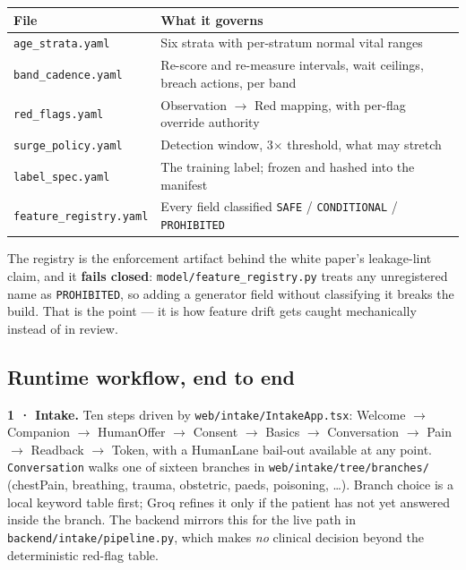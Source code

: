\documentclass[10pt,a4paper,twocolumn]{article}
\newcommand{\pth}[1]{\textcolor{SecPurple}{\texttt{#1}}}
\newcommand{\cm}[1]{\texttt{#1}}
\begin{document}
\begin{center}\footnotesize\sffamily
\begin{tabular}{@{}p{3.15cm}p{4.65cm}@{}}
\toprule
\rowcolor{AccPurple!10}
\textbf{File} & \textbf{What it governs}\\
\midrule
\cm{age\_strata.yaml} & Six strata with per-stratum normal vital ranges\\
\addlinespace[2pt]
\cm{band\_cadence.yaml} & Re-score and re-measure intervals, wait ceilings, breach actions, per band\\
\addlinespace[2pt]
\cm{red\_flags.yaml} & Observation $\rightarrow$ Red mapping, with per-flag override authority\\
\addlinespace[2pt]
\cm{surge\_policy.yaml} & Detection window, 3$\times$ threshold, what may stretch\\
\addlinespace[2pt]
\cm{label\_spec.yaml} & The training label; frozen and hashed into the manifest\\
\addlinespace[2pt]
\cm{feature\_registry.yaml} & Every field classified \cm{SAFE} / \cm{CONDITIONAL} / \cm{PROHIBITED}\\
\bottomrule
\end{tabular}
\end{center}

\vspace{3pt}
The registry is the enforcement artifact behind the white paper's leakage-lint claim, and it
\textbf{fails closed}: \pth{model/feature\_registry.py} treats any unregistered name as
\cm{PROHIBITED}, so adding a generator field without classifying it breaks the build. That is the
point --- it is how feature drift gets caught mechanically instead of in review.

\subsection{Runtime workflow, end to end}

\textbf{1 · Intake.} Ten steps driven by \pth{web/intake/IntakeApp.tsx}: Welcome $\rightarrow$
Companion $\rightarrow$ HumanOffer $\rightarrow$ Consent $\rightarrow$ Basics $\rightarrow$
Conversation $\rightarrow$ Pain $\rightarrow$ Readback $\rightarrow$ Token, with a HumanLane bail-out
available at any point. \cm{Conversation} walks one of sixteen branches in
\pth{web/intake/tree/branches/} (chestPain, breathing, trauma, obstetric, paeds, poisoning, …).
Branch choice is a local keyword table first; Groq refines it only if the patient has not yet
answered inside the branch. The backend mirrors this for the live path in
\pth{backend/intake/pipeline.py}, which makes \emph{no} clinical decision beyond the deterministic
red-flag table.
\end{document}
